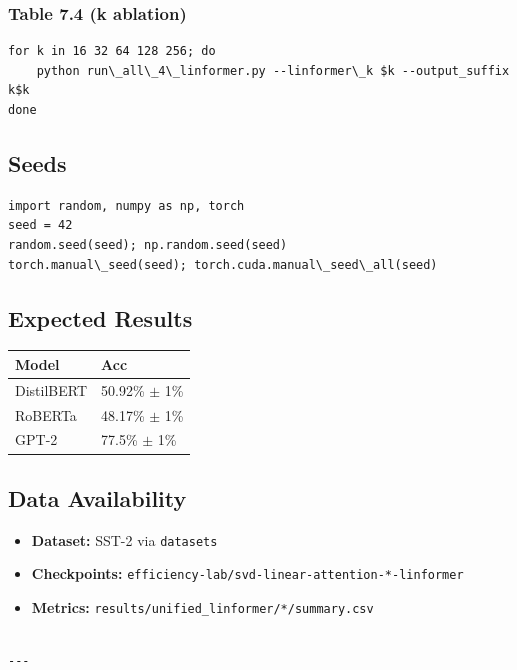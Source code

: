 \subsubsection{Table 7.4 (k ablation)}
\begin{lstlisting}
for k in 16 32 64 128 256; do
    python run\_all\_4\_linformer.py --linformer\_k $k --output_suffix k$k
done
\end{lstlisting}

\subsection{Seeds}

\begin{lstlisting}
import random, numpy as np, torch
seed = 42
random.seed(seed); np.random.seed(seed)
torch.manual\_seed(seed); torch.cuda.manual\_seed\_all(seed)
\end{lstlisting}

\subsection{Expected Results}

\begin{table}[H]
\centering
\small
\begin{tabular}{ll}
\toprule
\textbf{Model} & \textbf{Acc} \\
\midrule
DistilBERT & 50.92\% $\pm$ 1\% \\
RoBERTa & 48.17\% $\pm$ 1\% \\
GPT-2 & 77.5\% $\pm$ 1\% \\
\bottomrule
\end{tabular}
\end{table}

\subsection{Data Availability}

\begin{itemize}
\item \textbf{Dataset:} SST-2 via \texttt{datasets}
\item \textbf{Checkpoints:} \texttt{efficiency-lab/svd-linear-attention-*-linformer}
\item \textbf{Metrics:} \texttt{results/unified\_linformer/*/summary.csv}
\end{itemize}
\begin{lstlisting}

---
\end{lstlisting}

